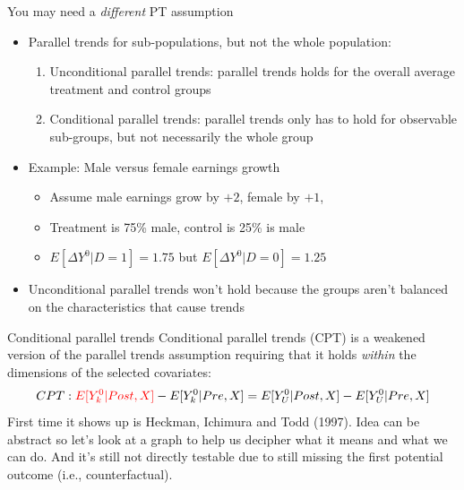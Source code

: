 \documentclass{beamer}
\begin{document}
\begin{frame}{You may need a \emph{different} PT assumption}

\begin{itemize}
\item Parallel trends for sub-populations, but not the whole population:
	\begin{enumerate}
	\item Unconditional parallel trends:  parallel trends holds for the overall average treatment and control groups
	\item Conditional parallel trends: parallel trends only has to hold for observable sub-groups, but not necessarily the whole group
	\end{enumerate}
\item Example: Male versus female earnings growth
	\begin{itemize}
	\item Assume male earnings grow by $+2$, female by $+1$,
	\item Treatment is 75\% male, control is 25\% is male
	\item $E[\Delta Y^0|D=1]=1.75$ but $E[\Delta Y^0|D=0]=1.25$
	\end{itemize}
\item Unconditional parallel trends won't hold because the groups aren't balanced on the characteristics that cause trends
\end{itemize}

\end{frame}



\begin{frame}{Conditional parallel trends}
Conditional parallel trends (CPT) is a weakened version of the parallel trends assumption requiring that it holds \emph{within} the dimensions of the selected covariates:
\begin{align*}
CPT: \textcolor{red}{E[Y^0_k|Post, X]} - E[Y^0_k|Pre, X] = E[Y^0_U|Post, X] - E[Y^0_U|Pre, X]
\end{align*}
First time it shows up is Heckman, Ichimura and Todd (1997). Idea can be abstract so let's look at a graph to help us decipher what it means and what we can do. And it's still not directly testable due to still missing the first potential outcome (i.e., counterfactual).
\end{frame}
\end{document}

